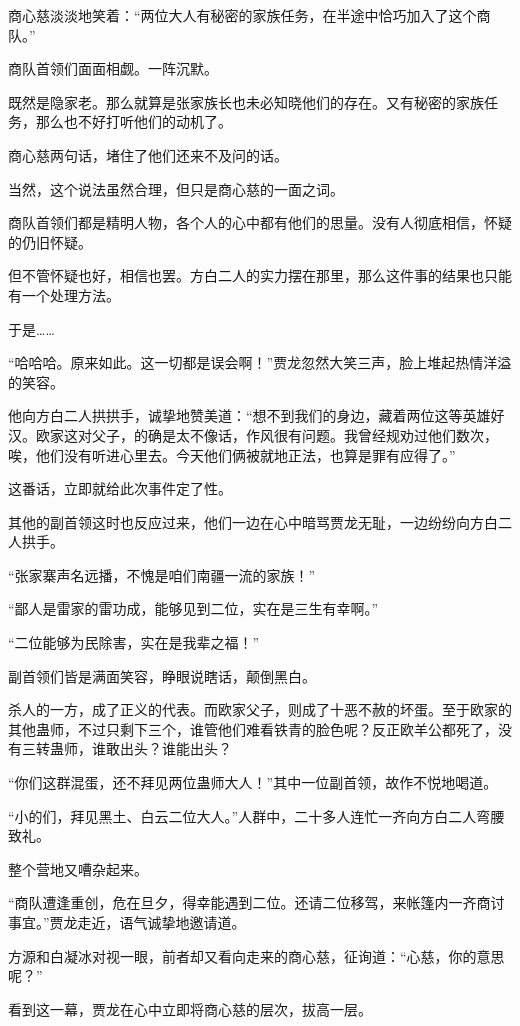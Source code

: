 \begin{this_body}
商心慈淡淡地笑着：“两位大人有秘密的家族任务，在半途中恰巧加入了这个商队。”

商队首领们面面相觑。一阵沉默。

既然是隐家老。那么就算是张家族长也未必知晓他们的存在。又有秘密的家族任务，那么也不好打听他们的动机了。

商心慈两句话，堵住了他们还来不及问的话。

当然，这个说法虽然合理，但只是商心慈的一面之词。

商队首领们都是精明人物，各个人的心中都有他们的思量。没有人彻底相信，怀疑的仍旧怀疑。

但不管怀疑也好，相信也罢。方白二人的实力摆在那里，那么这件事的结果也只能有一个处理方法。

于是……

“哈哈哈。原来如此。这一切都是误会啊！”贾龙忽然大笑三声，脸上堆起热情洋溢的笑容。

他向方白二人拱拱手，诚挚地赞美道：“想不到我们的身边，藏着两位这等英雄好汉。欧家这对父子，的确是太不像话，作风很有问题。我曾经规劝过他们数次，唉，他们没有听进心里去。今天他们俩被就地正法，也算是罪有应得了。”

这番话，立即就给此次事件定了性。

其他的副首领这时也反应过来，他们一边在心中暗骂贾龙无耻，一边纷纷向方白二人拱手。

“张家寨声名远播，不愧是咱们南疆一流的家族！”

“鄙人是雷家的雷功成，能够见到二位，实在是三生有幸啊。”

“二位能够为民除害，实在是我辈之福！”

副首领们皆是满面笑容，睁眼说瞎话，颠倒黑白。

杀人的一方，成了正义的代表。而欧家父子，则成了十恶不赦的坏蛋。至于欧家的其他蛊师，不过只剩下三个，谁管他们难看铁青的脸色呢？反正欧羊公都死了，没有三转蛊师，谁敢出头？谁能出头？

“你们这群混蛋，还不拜见两位蛊师大人！”其中一位副首领，故作不悦地喝道。

“小的们，拜见黑土、白云二位大人。”人群中，二十多人连忙一齐向方白二人弯腰致礼。

整个营地又嘈杂起来。

“商队遭逢重创，危在旦夕，得幸能遇到二位。还请二位移驾，来帐篷内一齐商讨事宜。”贾龙走近，语气诚挚地邀请道。

方源和白凝冰对视一眼，前者却又看向走来的商心慈，征询道：“心慈，你的意思呢？”

看到这一幕，贾龙在心中立即将商心慈的层次，拔高一层。


\end{this_body}
